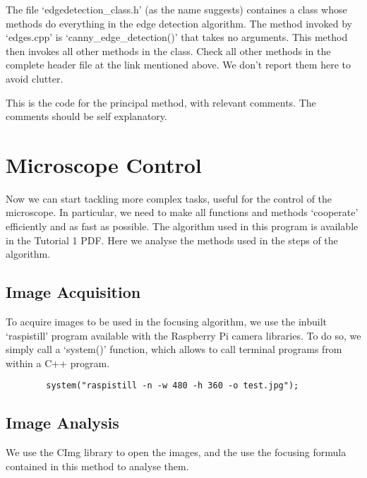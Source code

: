 \documentclass[a4paper]{article}
\begin{document}
			The file `edgedetection\_class.h' (as the name suggests) containes a class whose methods do everything in the edge detection algorithm.
			The method invoked by `edges.cpp' is `canny\_edge\_detection()' that takes no arguments.
			This method then invokes all other methods in the class.
			Check all other methods in the complete header file at the link mentioned above.
			We don't report them here to avoid clutter.
			
			This is the code for the principal method, with relevant comments.
			The comments should be self explanatory.
						
		
			
	\section*{Microscope Control}
	
		Now we can start tackling more complex tasks, useful for the control of the microscope.
		In particular, we need to make all functions and methods `cooperate' efficiently and as fast as possible.
		The algorithm used in this program is available in the Tutorial 1 PDF.
		Here we analyse the methods used in the steps of the algorithm.
		
	\subsection*{Image Acquisition}
	
			To acquire images to be used in the focusing algorithm, we use the inbuilt `raspistill' program available with the Raspberry Pi camera libraries.
			To do so, we simply call a `system()' function, which allows to call terminal programs from within a C++ program.
			
		\begin{lstlisting}
		system("raspistill -n -w 480 -h 360 -o test.jpg");
		\end{lstlisting}
			
	\subsection*{Image Analysis}
	
			We use the CImg library to open the images, and the use the focusing formula contained in this method to analyse them.
			
		
			
\end{document}
